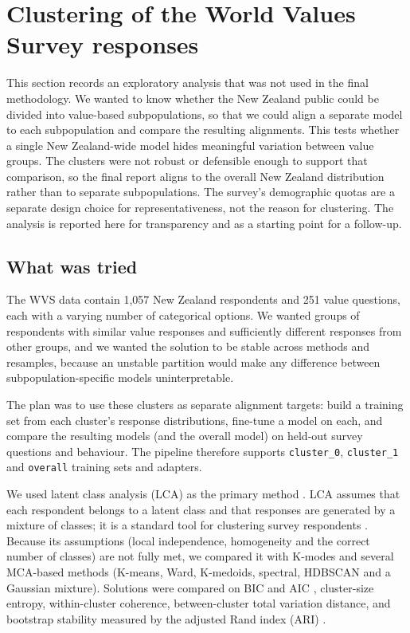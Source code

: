 \section{Clustering of the World Values Survey responses}
\label{subsec:clustering-survey}

This section records an exploratory analysis that was not used in the final methodology. We wanted to know whether the New Zealand public could be divided into value-based subpopulations, so that we could align a separate model to each subpopulation and compare the resulting alignments. This tests whether a single New Zealand-wide model hides meaningful variation between value groups. The clusters were not robust or defensible enough to support that comparison, so the final report aligns to the overall New Zealand distribution rather than to separate subpopulations. The survey's demographic quotas are a separate design choice for representativeness, not the reason for clustering. The analysis is reported here for transparency and as a starting point for a follow-up.

\subsection{What was tried}

The WVS data contain 1,057 New Zealand respondents and 251 value questions, each with a varying number of categorical options. We wanted groups of respondents with similar value responses and sufficiently different responses from other groups, and we wanted the solution to be stable across methods and resamples, because an unstable partition would make any difference between subpopulation-specific models uninterpretable.

The plan was to use these clusters as separate alignment targets: build a training set from each cluster's response distributions, fine-tune a model on each, and compare the resulting models (and the overall model) on held-out survey questions and behaviour. The pipeline therefore supports \texttt{cluster\_0}, \texttt{cluster\_1} and \texttt{overall} training sets and adapters.

We used latent class analysis (LCA) as the primary method \cite{lazarsfeldLatentStructureAnalysis1968,bakkEstimatingAssociationLatent2013,golliniMixtureLatentTrait2013}. LCA assumes that each respondent belongs to a latent class and that responses are generated by a mixture of classes; it is a standard tool for clustering survey respondents \cite{magunBetweenCountryValueDiversity2016}. Because its assumptions (local independence, homogeneity and the correct number of classes) are not fully met, we compared it with K-modes and several MCA-based methods (K-means, Ward, K-medoids, spectral, HDBSCAN and a Gaussian mixture). Solutions were compared on BIC and AIC \cite{schwarzEstimatingDimensionModel1978}, cluster-size entropy, within-cluster coherence, between-cluster total variation distance, and bootstrap stability measured by the adjusted Rand index (ARI) \cite{hubertComparingPartitions1985}.

